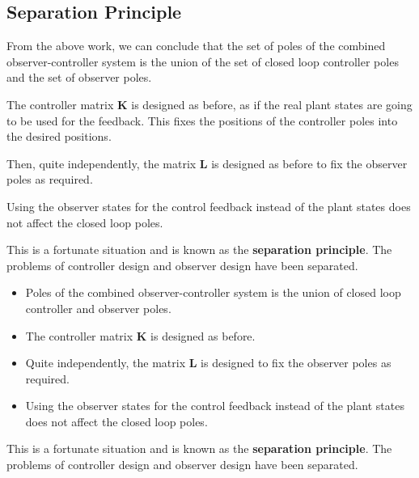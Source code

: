 
\ifslidesonly
\begin{slide}
   
\end{slide}
\fi






\subsection*{Separation Principle} %
\label{sub:separation_principle}

From the above work, we can conclude that the set of poles of the combined observer-controller system is the union of the set of closed loop controller poles and the set of observer poles.

The controller matrix  $\mathbf{K}$  is designed as before, as if the real plant states are going to be used for the feedback. This fixes the positions of the controller poles into the desired positions.

Then, quite independently, the matrix $\mathbf{L}$ is designed as before to fix the observer poles as required.

Using the observer states for the control feedback instead of the plant states does not affect the closed loop poles.

This is a fortunate situation and is known as the \textbf{separation principle}. The problems of controller design and observer design have been separated.

\ifslidesonly
\begin{slide}
	\begin{itemize}
		\item Poles of the combined observer-controller system is the union of closed loop controller and observer poles.
		\item The controller matrix  $\mathbf{K}$  is designed as before.
		\item Quite independently, the matrix $\mathbf{L}$ is designed to fix the observer poles as required.
		\item Using the observer states for the control feedback instead of the plant states does not affect the closed loop poles.
	\end{itemize}
   This is a fortunate situation and is known as the \textbf{separation principle}. The problems of controller design and observer design have been separated.
\end{slide}
\fi
 
